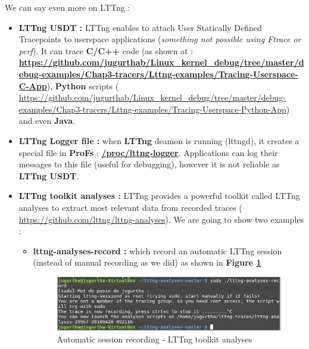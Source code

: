 We can say even more on LTTng : 
\begin{itemize}
	\item \textbf{LTTng USDT : } LTTng enables to attach User Statically Defined Tracepoints to userspace applications (\emph{something not possible using Ftrace or perf}). It can trace \textbf{C/C++} code (as shown at : \textbf{\color{blue}\url{https://github.com/jugurthab/Linux_kernel_debug/tree/master/debug-examples/Chap3-tracers/Lttng-examples/Tracing-Userspace-C-App}}), \textbf{Python} scripts ({\color{blue} \url{https://github.com/jugurthab/Linux_kernel_debug/tree/master/debug-examples/Chap3-tracers/Lttng-examples/Tracing-Userspace-Python-App}}) and even \textbf{Java}. 
	
	\item \textbf{LTTng Logger file : } when \textbf{LTTng} deamon is running (lttngd), it creates a special file in \textbf{ProFs} : \textbf{\color{red}\url{/proc/lttng-logger}}.
		Applications can log their messages to this file (useful for debugging), however it is not reliable as \textbf{LTTng USDT}.
	
	\item \textbf{LTTng toolkit analyses : }
LTTng provides a powerful toolkit called \og LTTng analyses \fg to extract most relevant data from recorded traces ({\color{blue} \url{https://github.com/lttng/lttng-analyses}}). We are going to show two examples :

		\begin{itemize}
			\item \textbf{lttng-analyses-record : } which record an automatic LTTng session (instead of manual recording as we did) as shown in \textbf{Figure \ref{Automatic session recording - LTTng toolkit analyses}}
					\begin{figure}[H]
						\centering
        				\includegraphics[scale=0.40]{img/solution/lttng-analyses-automatic-record.png}
        				\caption{Automatic session recording - LTTng toolkit analyses}
        				\label{Automatic session recording - LTTng toolkit analyses}
    				\end{figure}
			

\end{itemize}
\end{itemize}
